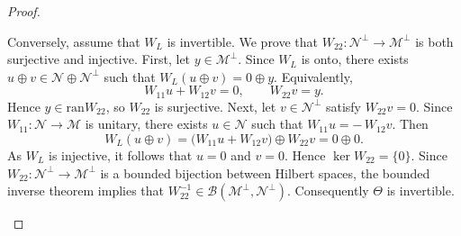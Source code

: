 \documentclass[10pt,a4paper]{amsart}
\newcommand{\clb}{\mathcal{B}}
\newcommand{\clm}{\mathcal{M}}
\newcommand{\cln}{\mathcal{N}}
\newcommand{\ran}{\mathrm{ran}}
\begin{document}
\begin{proof}
\begin{enumerate}
Conversely, assume that $W_L$ is invertible. We prove that $W_{22}:\cln^{\perp} \to \clm^{\perp}$ is both surjective and injective.
First, let $y\in \clm^\perp$. Since $W_L$ is onto, there exists $u\oplus v\in \cln\oplus \cln^\perp$ such that $W_L(u\oplus v)=0\oplus y.$
Equivalently,
\[
W_{11}u+W_{12}v=0, \qquad W_{22}v=y.
\]
Hence $y\in \ran W_{22}$, so $W_{22}$ is surjective.
Next, let $v\in \cln^\perp$ satisfy $W_{22}v=0$. Since $W_{11}:\cln\to \clm$ is unitary, there exists $u\in \cln$ such that $W_{11}u=-\,W_{12}v.$
Then
\[
W_L(u\oplus v)=\big(W_{11}u+W_{12}v\big)\oplus W_{22}v=0\oplus 0.
\]
As $W_L$ is injective, it follows that $u=0$ and $v=0$. Hence $\ker W_{22}=\{0\}$. Since $W_{22}: \cln^\perp \to \clm^\perp$ is a bounded bijection between Hilbert spaces, the bounded inverse theorem implies that \(W_{22}^{-1}\in \clb(\clm^\perp,\cln^\perp)\).
Consequently $\Theta$ is invertible. 
\end{enumerate}
\end{proof}
\end{document}
